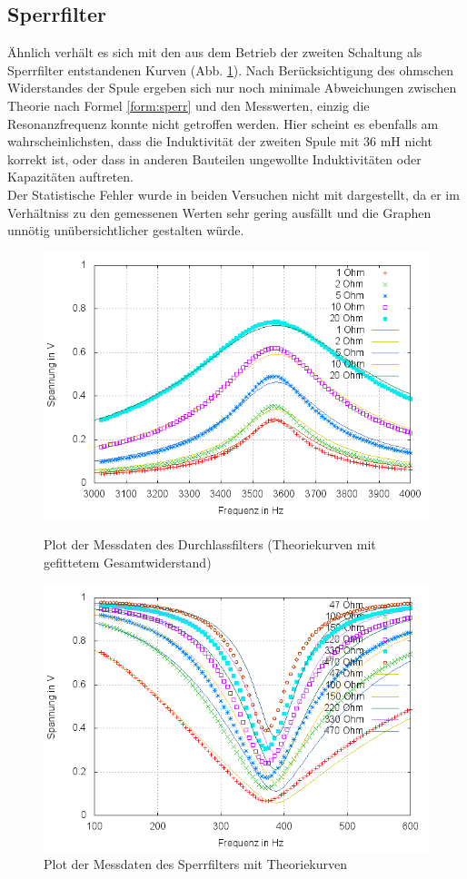 \subsection{Sperrfilter}
Ähnlich verhält es sich mit den aus dem Betrieb der zweiten Schaltung als Sperrfilter entstandenen Kurven (Abb. \ref{plot:sperr}). Nach Berücksichtigung des ohmschen Widerstandes der Spule ergeben sich nur noch minimale Abweichungen zwischen Theorie nach Formel \eqref{form:sperr} und den Messwerten, einzig die Resonanzfrequenz konnte nicht getroffen werden. Hier scheint es ebenfalls am wahrscheinlichsten, dass die Induktivität der zweiten Spule mit 36 mH nicht korrekt ist, oder dass in anderen Bauteilen ungewollte Induktivitäten oder Kapazitäten auftreten.
\\
Der Statistische Fehler wurde in beiden Versuchen nicht mit dargestellt, da er im Verhältniss zu den gemessenen Werten sehr gering ausfällt und die Graphen unnötig unübersichtlicher gestalten würde.
\begin{figure}
	\includegraphics[width=.9\textwidth]{images/plot/durchlassfilter+theorie+R_ges-fit.png}
\caption{Plot der Messdaten des Durchlassfilters (Theoriekurven mit gefittetem Gesamtwiderstand)}
\label{plot:durchlass+R_ges-fit}

        \includegraphics[width=.9\textwidth]{images/plot/sperrfilter+theorie+R_L.png}
\caption{Plot der Messdaten des Sperrfilters mit Theoriekurven}
\label{plot:sperr}
\end{figure}

